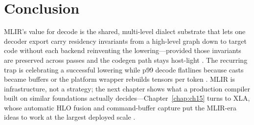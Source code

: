 \section{Conclusion}
\label{sec:ch14_conclusion}

MLIR's value for decode is the shared, multi-level dialect substrate that lets one decoder export carry residency invariants from a high-level graph down to target code without each backend reinventing the lowering---provided those invariants are preserved across passes and the codegen path stays host-light \citep{lai2023relax,yirage2026}. The recurring trap is celebrating a successful lowering while p99 decode flatlines because casts became buffers or the platform wrapper rebuilds tensors per token \citep{taxbreak2026,memoryfloor2026}. MLIR is infrastructure, not a strategy; the next chapter shows what a production compiler built on similar foundations actually decides---Chapter~\ref{chap:ch15} turns to XLA, whose automatic HLO fusion and command-buffer capture put the MLIR-era ideas to work at the largest deployed scale \citep{openxla2024,nvidia2024cudagraphs}.

